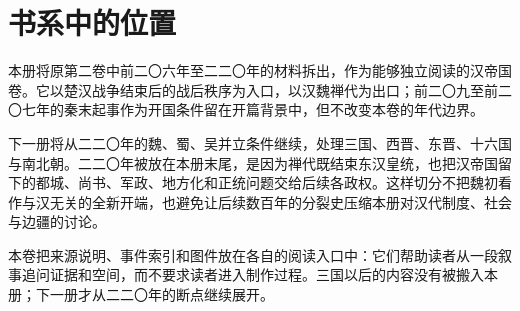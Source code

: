 \chapter{书系中的位置}
\label{app:series-roadmap}

本册将原第二卷中前二〇六年至二二〇年的材料拆出，作为能够独立阅读的汉帝国卷。它以楚汉战争结束后的战后秩序为入口，以汉魏禅代为出口；前二〇九至前二〇七年的秦末起事作为开国条件留在开篇背景中，但不改变本卷的年代边界。

下一册将从二二〇年的魏、蜀、吴并立条件继续，处理三国、西晋、东晋、十六国与南北朝。二二〇年被放在本册末尾，是因为禅代既结束东汉皇统，也把汉帝国留下的都城、尚书、军政、地方化和正统问题交给后续各政权。这样切分不把魏初看作与汉无关的全新开端，也避免让后续数百年的分裂史压缩本册对汉代制度、社会与边疆的讨论。

本卷把来源说明、事件索引和图件放在各自的阅读入口中：它们帮助读者从一段叙事追问证据和空间，而不要求读者进入制作过程。三国以后的内容没有被搬入本册；下一册才从二二〇年的断点继续展开。
